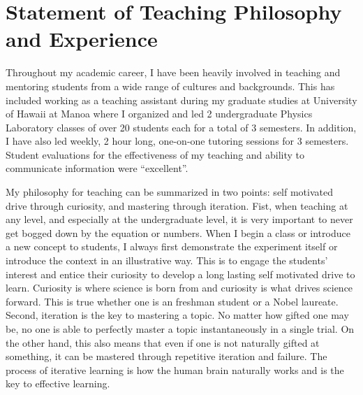\documentclass[10pt]{article} %
\begin{document}

\clearpage
\section{Statement of Teaching Philosophy and Experience}

Throughout my academic career, I have been heavily involved in teaching and
mentoring students from a wide range of cultures and backgrounds. This has
included working as a teaching assistant during my graduate studies at
University of Hawaii at Manoa where I organized and led 2 undergraduate Physics
Laboratory classes of over 20 students each for a total of 3 semesters. In
addition, I have also led weekly, 2 hour long, one-on-one tutoring sessions for
3 semesters. Student evaluations for the effectiveness of my teaching and
ability to communicate information were ``excellent''.

My philosophy for teaching can be summarized in two points: self motivated
drive through curiosity, and mastering through iteration. Fist, when teaching
at any level, and especially at the undergraduate level, it is very important
to never get bogged down by the equation or numbers. When I begin a class or
introduce a new concept to students, I always first demonstrate the experiment
itself or introduce the context in an illustrative way. This is to engage the
students’ interest and entice their curiosity to develop a long lasting self
motivated drive to learn. Curiosity is where science is born from and curiosity
is what drives science forward. This is true whether one is an freshman student
or a Nobel laureate. Second, iteration is the key to mastering a topic. No
matter how gifted one may be, no one is able to perfectly master a topic
instantaneously in a single trial. On the other hand, this also means that even
if one is not naturally gifted at something, it can be mastered through
repetitive iteration and failure. The process of iterative learning is how the
human brain naturally works and is the key to effective learning.
\end{document}
